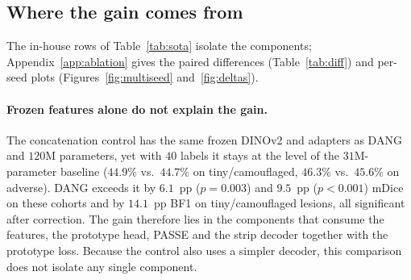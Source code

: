 \documentclass[10pt,twocolumn]{article}
\begin{document}
\begin{table}[!t]
  \centering
  \caption{\textbf{Standard training split ($1{,}450$ images).} mDice (\%) at native resolution and ETIS BF1; mean $\pm$ SD over $3$ seeds for our runs. Published Polyp-PVT scores from~\citet{dong2021polyp}. \textbf{Bold}: better of our two runs.}
  \label{tab:std}
  \vspace{2pt}
  \setlength{\tabcolsep}{2.5pt}
\end{table}

\subsection{Where the gain comes from}
\label{sec:ablation}
The in-house rows of Table~\ref{tab:sota} isolate the components; Appendix~\ref{app:ablation} gives the paired differences (Table~\ref{tab:diff}) and per-seed plots (Figures~\ref{fig:multiseed} and~\ref{fig:deltas}).

\paragraph{Frozen features alone do not explain the gain.} The concatenation control has the same frozen DINOv2 and adapters as DANG and $120$M parameters, yet with $40$ labels it stays at the level of the $31$M-parameter baseline ($44.9\%$ vs.\ $44.7\%$ on tiny/camouflaged, $46.3\%$ vs.\ $45.6\%$ on adverse). DANG exceeds it by $6.1$~pp ($p=0.003$) and $9.5$~pp ($p<0.001$) mDice on these cohorts and by $14.1$~pp BF1 on tiny/camouflaged lesions, all significant after correction. The gain therefore lies in the components that consume the features, the prototype head, PASSE and the strip decoder together with the prototype loss. Because the control also uses a simpler decoder, this comparison does not isolate any single component.
\end{document}
